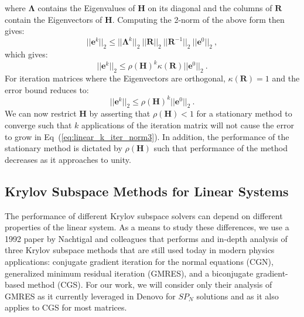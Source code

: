 \documentclass[letterpaper,12pt]{article}
\begin{document}
where $\boldsymbol{\Lambda}$ contains the Eigenvalues of $\mathbf{H}$
on its diagonal and the columns of $\mathbf{R}$ contain the
Eigenvectors of $\mathbf{H}$. Computing the 2-norm of the above form
then gives:
\begin{equation}
  ||\mathbf{e}^{k}||_2 \leq ||\boldsymbol{\Lambda}^k||_2\ 
  ||\mathbf{R}||_2\ ||\mathbf{R}^{-1}||_2\ ||\mathbf{e}^0||_2\:,
  \label{eq:linear_k_iter_norm1}
\end{equation}
which gives:
\begin{equation}
  ||\mathbf{e}^{k}||_2 \leq \rho(\mathbf{H})^k \kappa(\mathbf{R})
  ||\mathbf{e}^0||_2\:.
  \label{eq:linear_k_iter_norm2}
\end{equation}
For iteration matrices where the Eigenvectors are orthogonal,
$\kappa(\mathbf{R})=1$ and the error bound reduces to:
\begin{equation}
  ||\mathbf{e}^{k}||_2 \leq \rho(\mathbf{H})^k
  ||\mathbf{e}^0||_2\:.
  \label{eq:linear_k_iter_norm3}
\end{equation}
We can now restrict $\mathbf{H}$ by asserting that $\rho(\mathbf{H}) <
1$ for a stationary method to converge such that $k$ applications of
the iteration matrix will not cause the error to grow in
Eq~(\ref{eq:linear_k_iter_norm3}). In addition, the performance of the
stationary method is dictated by $\rho(\mathbf{H})$ such that
performance of the method decreases as it approaches to unity.

\subsection{Krylov Subspace Methods for Linear Systems}
\label{subsec:subspace_solvers}
The performance of different Krylov subspace solvers can depend on
different properties of the linear system. As a means to study these
differences, we use a 1992 paper by Nachtigal and colleagues
\cite{nachtigal_how_1992} that performs and in-depth analysis of three
Krylov subspace methods that are still used today in modern physics
applications: conjugate gradient iteration for the normal equations
(CGN), generalized minimum residual iteration (GMRES), and a
biconjugate gradient-based method (CGS). For our work, we will
consider only their analysis of GMRES as it currently leveraged in
Denovo for $SP_N$ solutions and as it also applies to CGS for most
matrices.
\end{document}
